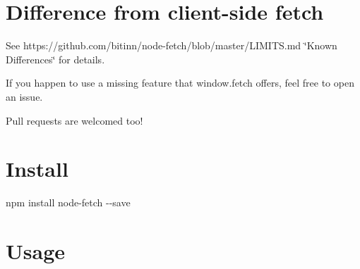 \section*{Difference from client-\/side fetch}


\begin{DoxyItemize}
\item See https\+://github.com/bitinn/node-\/fetch/blob/master/\+L\+I\+M\+I\+T\+S.\+md \char`\"{}\+Known Differences\char`\"{} for details.
\item If you happen to use a missing feature that {\ttfamily window.\+fetch} offers, feel free to open an issue.
\item Pull requests are welcomed too!
\end{DoxyItemize}

\section*{Install}

{\ttfamily npm install node-\/fetch -\/-\/save}

\section*{Usage}


